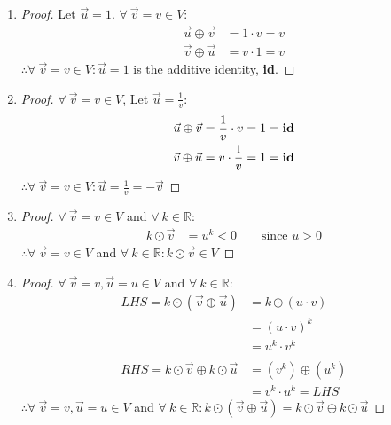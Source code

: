 \documentclass{article}
\newcommand{\bld}{\textbf}
\newcommand{\bb}{\mathbb}
\newcommand{\bitem}[1]{\item[\bld{#1.}]}
\begin{document}
\begin{enumerate}
\begin{proof}
  \end{proof}
  \bitem{Axiom 4}
  \begin{proof}
    Let $\vec{u} = 1$. $\forall~\vec{v} = v \in V$:
    \begin{align*}
      \vec{u} \oplus \vec{v} & = 1 \cdot v = v \\
      \vec{v} \oplus \vec{u} & = v \cdot 1 = v
    \end{align*}
    $\therefore \forall~\vec{v} = v \in V: \vec{u} = 1$ is the additive identity, \bld{id}.
  \end{proof}
  \bitem{Axiom 5}
  \begin{proof}
    $\forall~\vec{v} = v \in V$, Let $\vec{u} = \frac{1}{v}$:
    \begin{align*}
      \vec{u} \oplus \vec{v} & = \frac{1}{v} \cdot v = 1 = \text{\bld{id}} \\
      \vec{v} \oplus \vec{u} & = v \cdot \frac{1}{v} = 1 = \text{\bld{id}}
    \end{align*}
    $\therefore \forall~\vec{v} = v \in V: \vec{u} = \frac{1}{v} = -\vec{v}$
  \end{proof}
  \bitem{Axiom 6}
  \begin{proof}
    $\forall~\vec{v} = v \in V$ and $\forall~k \in \bb{R}$:
    \begin{align*}
      k \odot \vec{v} & = u^k < 0 \qquad \text{since $u>0$}
    \end{align*}
    $\therefore \forall~\vec{v} = v \in V$ and $\forall~k \in \bb{R}: k \odot \vec{v} \in V$
  \end{proof}
  \bitem{Axiom 7}
  \begin{proof}
    $\forall~\vec{v} = v,\vec{u} = u \in V$ and $\forall~k \in \bb{R}$:
    \begin{align*}
      LHS = k \odot (\vec{v} \oplus \vec{u})       & = k \odot (u \cdot v) \\
                                                   & = (u \cdot v)^k       \\
                                                   & = u^k \cdot v^k       \\ \\
      RHS = k \odot \vec{v} \oplus k \odot \vec{u} & = (v^k) \oplus (u^k)  \\
                                                   & = v^k \cdot u^k = LHS
    \end{align*}
    $\therefore \forall~\vec{v} = v,\vec{u} = u \in V$ and $\forall~k \in \bb{R}: k \odot (\vec{v} \oplus \vec{u}) = k \odot \vec{v} \oplus k \odot \vec{u}$

\end{proof}
\end{enumerate}
\end{document}
